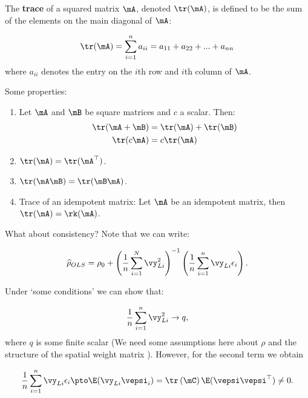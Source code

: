 \documentclass[english,12pt]{book}\usepackage[]{graphicx}\usepackage[]{xcolor}
\begin{document}
\begin{definition}\label{definition:trace}
  The \textbf{trace} of a squared matrix $\mA$, denoted $\tr(\mA)$, is defined to be the sum of the elements on the main diagonal of $\mA$:
  
  \begin{equation}
    \tr(\mA) = \sum_{i = 1}^n a_{ii} = a_{11} + a_{22} + ... + a_{nn}
  \end{equation}
  where $a_{ii}$ denotes the entry on the $i$th row and $i$th column of $\mA$. 
  
 Some properties:
 \begin{enumerate}
  \item Let $\mA$ and $\mB$ be square matrices and $c$ a scalar. Then:
  \begin{align}
    \tr(\mA + \mB) & = \tr(\mA) + \tr(\mB) \\
    \tr(c\mA) & = c\tr(\mA)
  \end{align}
  \item $\tr(\mA) = \tr(\mA^{\top})$. 
  \item $\tr(\mA\mB) = \tr(\mB\mA)$.
  \item Trace of an idempotent matrix: Let $\mA$ be an idempotent matrix, then $\tr(\mA)= \rk(\mA)$. 
 \end{enumerate}
\end{definition}

What about consistency? Note that we can write: 

\begin{equation}
          \widehat{\rho}_{OLS} = \rho_0 + \left(\frac{1}{n}\sum_{i = 1}^N \vy_{Li}^2\right)^{-1}\left(\frac{1}{n}\sum_{i = 1}^{n}\vy_{Li}\epsilon_i\right).
\end{equation}

Under `some conditions' we can show that:

\begin{equation}
\frac{1}{n}\sum_{i = 1}^n \vy_{Li}^2 \to q,
\end{equation}
%
where $q$ is some finite scalar (We need some assumptions here about $\rho$ and the structure of the spatial weight matrix ). However, for the second term we obtain

\begin{equation}
  \frac{1}{n}\sum_{i = 1}^{n}\vy_{Li}\epsilon_i \pto \E(\vy_{Li}\vepsi_i) = \tr \left(\mC\right) \E(\vepsi\vepsi^\top) \neq 0.
\end{equation}
\end{document}
